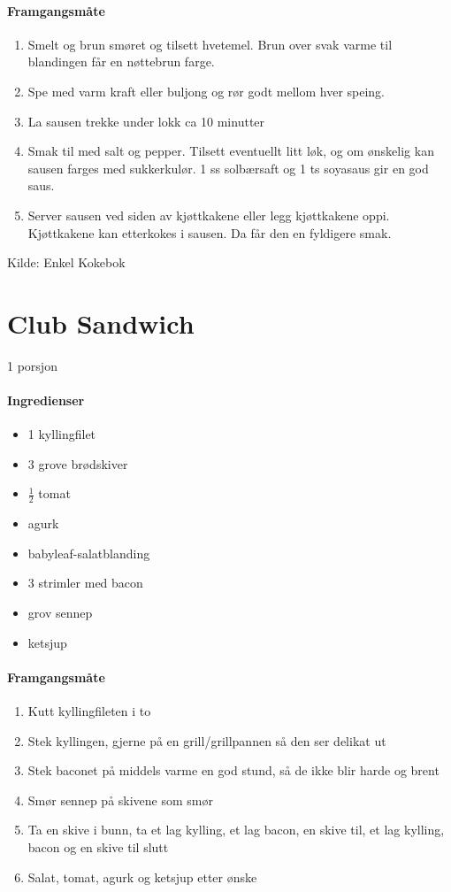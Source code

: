\documentclass[12pt,a4paper]{book}
\begin{document}
\paragraph{Framgangsmåte}
\begin{enumerate}[noitemsep]
	\item Smelt og brun smøret og tilsett hvetemel. Brun over svak varme til blandingen får en nøttebrun farge.
	\item Spe med varm kraft eller buljong og rør godt mellom hver speing.
	\item La sausen trekke under lokk ca 10 minutter
	\item Smak til med salt og pepper. Tilsett eventuellt litt løk, og om ønskelig kan sausen farges med sukkerkulør. 1 ss solbærsaft og 1 ts soyasaus gir en god saus.
	\item Server sausen ved siden av kjøttkakene eller legg kjøttkakene oppi. Kjøttkakene kan etterkokes i sausen. Da får den en fyldigere smak.
\end{enumerate}

Kilde: Enkel Kokebok
\clearpage{}
\clearpage{}\section{﻿Club Sandwich}
1 porsjon

\paragraph{Ingredienser}
\begin{itemize}[noitemsep]
	\item 1 kyllingfilet
	\item 3 grove brødskiver
	\item $\frac{1}{2}$ tomat
	\item agurk
	\item babyleaf-salatblanding
	\item 3 strimler med bacon
	\item grov sennep
	\item ketsjup
\end{itemize}

\paragraph{Framgangsmåte}
\begin{enumerate}[noitemsep]
	\item Kutt kyllingfileten i to
	\item Stek kyllingen, gjerne på en grill/grillpannen så den ser delikat ut
	\item Stek baconet på middels varme en god stund, så de ikke blir harde og brent
	\item Smør sennep på skivene som smør
	\item Ta en skive i bunn, ta et lag kylling, et lag bacon, en skive til, et lag kylling, bacon og en skive til slutt
	\item Salat, tomat, agurk og ketsjup etter ønske
\end{enumerate}
\end{document}
